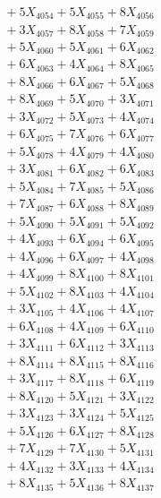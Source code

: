 \documentclass[a4paper,10pt]{article}
\begin{document}
{\begin{align}
&\;  + 5 X_{4054} + 5 X_{4055} + 8 X_{4056} \\[0.3ex]
&\;  + 3 X_{4057} + 8 X_{4058} + 7 X_{4059} \\[0.5ex]\allowbreak
&\;  + 5 X_{4060} + 5 X_{4061} + 6 X_{4062} \\[0.3ex]
&\;  + 6 X_{4063} + 4 X_{4064} + 8 X_{4065} \\[0.3ex]
&\;  + 8 X_{4066} + 6 X_{4067} + 5 X_{4068} \\[0.3ex]
&\;  + 8 X_{4069} + 5 X_{4070} + 3 X_{4071} \\[0.3ex]
&\;  + 3 X_{4072} + 5 X_{4073} + 4 X_{4074} \\[0.3ex]
&\;  + 6 X_{4075} + 7 X_{4076} + 6 X_{4077} \\[0.3ex]
&\;  + 5 X_{4078} + 4 X_{4079} + 4 X_{4080} \\[0.3ex]
&\;  + 3 X_{4081} + 6 X_{4082} + 6 X_{4083} \\[0.3ex]
&\;  + 5 X_{4084} + 7 X_{4085} + 5 X_{4086} \\[0.3ex]
&\;  + 7 X_{4087} + 6 X_{4088} + 8 X_{4089} \\[0.5ex]\allowbreak
&\;  + 5 X_{4090} + 5 X_{4091} + 5 X_{4092} \\[0.3ex]
&\;  + 4 X_{4093} + 6 X_{4094} + 6 X_{4095} \\[0.3ex]
&\;  + 4 X_{4096} + 6 X_{4097} + 4 X_{4098} \\[0.3ex]
&\;  + 4 X_{4099} + 8 X_{4100} + 8 X_{4101} \\[0.3ex]
&\;  + 5 X_{4102} + 8 X_{4103} + 4 X_{4104} \\[0.3ex]
&\;  + 3 X_{4105} + 4 X_{4106} + 4 X_{4107} \\[0.3ex]
&\;  + 6 X_{4108} + 4 X_{4109} + 6 X_{4110} \\[0.3ex]
&\;  + 3 X_{4111} + 6 X_{4112} + 3 X_{4113} \\[0.3ex]
&\;  + 8 X_{4114} + 8 X_{4115} + 8 X_{4116} \\[0.3ex]
&\;  + 3 X_{4117} + 8 X_{4118} + 6 X_{4119} \\[0.5ex]\allowbreak
&\;  + 8 X_{4120} + 5 X_{4121} + 3 X_{4122} \\[0.3ex]
&\;  + 3 X_{4123} + 3 X_{4124} + 5 X_{4125} \\[0.3ex]
&\;  + 5 X_{4126} + 6 X_{4127} + 8 X_{4128} \\[0.3ex]
&\;  + 7 X_{4129} + 7 X_{4130} + 5 X_{4131} \\[0.3ex]
&\;  + 4 X_{4132} + 3 X_{4133} + 4 X_{4134} \\[0.3ex]
&\;  + 8 X_{4135} + 5 X_{4136} + 8 X_{4137} \\[0.3ex]

\end{align}}
\end{document}
